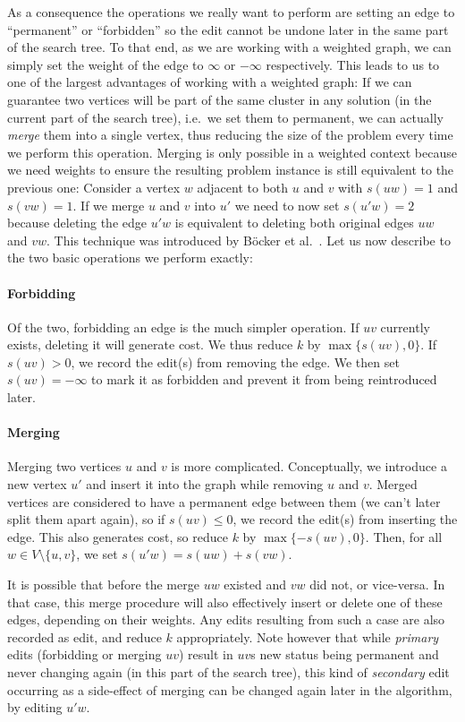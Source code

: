 \documentclass[12pt,oneside,english,parskip=full,headings=small]{scrbook}
\theoremstyle{definition}
\begin{document}
As a consequence the operations we really want to perform are setting an edge to ``permanent'' or
``forbidden'' so the edit cannot be undone later in the same part of the search tree. To that end,
as we are working with a weighted graph, we can simply set the weight of the edge to $\infty$ or
$-\infty$ respectively. This leads to us to one of the largest advantages of working with a weighted
graph: If we can guarantee two vertices will be part of the same cluster in any solution (in the
current part of the search tree), i.e.\ we set them to permanent, we can actually \emph{merge} them
into a single vertex, thus reducing the size of the problem every time we perform this operation.
Merging is only possible in a weighted context because we need weights to ensure the resulting
problem instance is still equivalent to the previous one: Consider a vertex $w$ adjacent to both $u$
and $v$ with $s(uw) = 1$ and $s(vw) = 1$. If we merge $u$ and $v$ into $u'$ we need to now set
$s(u'w) = 2$ because deleting the edge $u'w$ is equivalent to deleting both original edges $uw$ and
$vw$. This technique was introduced by Böcker et al.~\cite{AnApproach}. Let us now describe to the
two basic operations we perform exactly:

\paragraph{Forbidding} Of the two, forbidding an edge is the much simpler operation. If $uv$
currently exists, deleting it will generate cost. We thus reduce $k$ by $\max\{s(uv), 0\}$. If $s(uv)
> 0$, we record the edit(s) from removing the edge. We then set $s(uv) = -\infty$ to mark it as
forbidden and prevent it from being reintroduced later.

\paragraph{Merging} \label{sec:merging} Merging two vertices $u$ and $v$ is more complicated.
Conceptually, we introduce a new vertex $u'$ and insert it into the graph while removing $u$ and
$v$. Merged vertices are considered to have a permanent edge between them (we can't later split them
apart again), so if $s(uv) \leq 0$, we record the edit(s) from inserting the edge. This also
generates cost, so reduce $k$ by $\max\{-s(uv), 0\}$. Then, for all $w \in V \setminus \{u, v\}$, we
set $s(u'w) = s(uw) + s(vw)$.

It is possible that before the merge $uw$ existed and $vw$ did not, or vice-versa. In that case,
this merge procedure will also effectively insert or delete one of these edges, depending on their
weights. Any edits resulting from such a case are also recorded as edit, and reduce $k$
appropriately. Note however that while \emph{primary} edits (forbidding or merging $uv$) result in
$uv$s new status being permanent and never changing again (in this part of the search tree), this
kind of \emph{secondary} edit occurring as a side-effect of merging can be changed again later in
the algorithm, by editing $u'w$.
\end{document}
